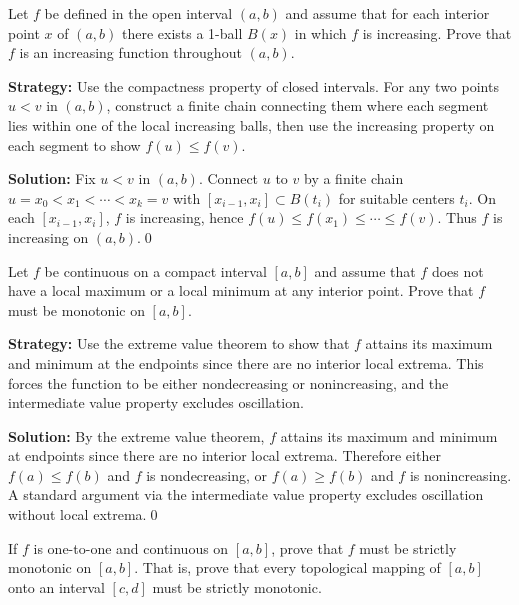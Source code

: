 \begin{problembox}
Let $f$ be defined in the open interval $(a, b)$ and assume that for each interior point $x$ of $(a, b)$ there exists a 1-ball $B(x)$ in which $f$ is increasing. Prove that $f$ is an increasing function throughout $(a, b)$.
\end{problembox}

\noindent\textbf{Strategy:} Use the compactness property of closed intervals. For any two points $u < v$ in $(a,b)$, construct a finite chain connecting them where each segment lies within one of the local increasing balls, then use the increasing property on each segment to show $f(u) \leq f(v)$.

\bigskip\noindent\textbf{Solution:}
Fix $u<v$ in $(a,b)$. Connect $u$ to $v$ by a finite chain $u=x_0<x_1<\cdots<x_k=v$ with $[x_{i-1},x_i]\subset B(t_i)$ for suitable centers $t_i$. On each $[x_{i-1},x_i]$, $f$ is increasing, hence $f(u)\le f(x_1)\le\cdots\le f(v)$. Thus $f$ is increasing on $(a,b)$.\qed



\begin{problembox}
Let $f$ be continuous on a compact interval $[a, b]$ and assume that $f$ does not have a local maximum or a local minimum at any interior point. Prove that $f$ must be monotonic on $[a, b]$.
\end{problembox}

\noindent\textbf{Strategy:} Use the extreme value theorem to show that $f$ attains its maximum and minimum at the endpoints since there are no interior local extrema. This forces the function to be either nondecreasing or nonincreasing, and the intermediate value property excludes oscillation.

\bigskip\noindent\textbf{Solution:}
By the extreme value theorem, $f$ attains its maximum and minimum at endpoints since there are no interior local extrema. Therefore either $f(a)\le f(b)$ and $f$ is nondecreasing, or $f(a)\ge f(b)$ and $f$ is nonincreasing. A standard argument via the intermediate value property excludes oscillation without local extrema.\qed



\begin{problembox}
If $f$ is one-to-one and continuous on $[a, b]$, prove that $f$ must be strictly monotonic on $[a, b]$. That is, prove that every topological mapping of $[a, b]$ onto an interval $[c, d]$ must be strictly monotonic.
\end{problembox}

